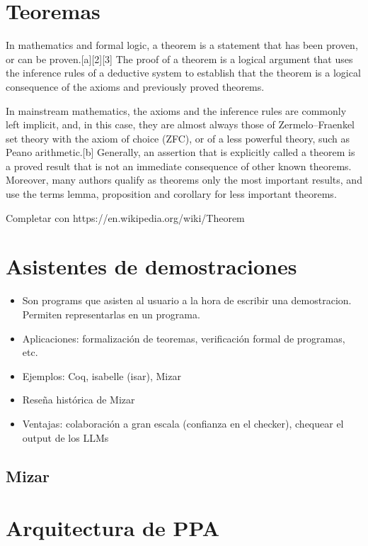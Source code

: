 \section{Teoremas}

In mathematics and formal logic, a theorem is a statement that has been proven, or can be proven.[a][2][3] The proof of a theorem is a logical argument that uses the inference rules of a deductive system to establish that the theorem is a logical consequence of the axioms and previously proved theorems.

In mainstream mathematics, the axioms and the inference rules are commonly left implicit, and, in this case, they are almost always those of Zermelo–Fraenkel set theory with the axiom of choice (ZFC), or of a less powerful theory, such as Peano arithmetic.[b] Generally, an assertion that is explicitly called a theorem is a proved result that is not an immediate consequence of other known theorems. Moreover, many authors qualify as theorems only the most important results, and use the terms lemma, proposition and corollary for less important theorems.

Completar con https://en.wikipedia.org/wiki/Theorem

\section{Asistentes de demostraciones}

\begin{itemize}
    \item Son programs que asisten al usuario a la hora de escribir una
    demostracion. Permiten representarlas en un programa.
    \item Aplicaciones: formalización de teoremas, verificación formal de
    programas, etc.
    \item Ejemplos: Coq, isabelle (isar), Mizar
    \item Reseña histórica de Mizar
    \item Ventajas: colaboración a gran escala (confianza en el checker),
    chequear el output de los LLMs
\end{itemize}

\subsection{Mizar}


\section{Arquitectura de PPA}

